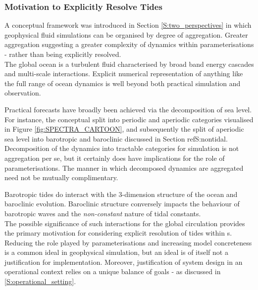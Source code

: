  
\subsubsection{Motivation to Explicitly Resolve Tides}

A conceptual framework was introduced in Section \ref{S:two_perspectives} in which geophysical fluid simulations can be organised by degree of aggregation.  Greater aggregation suggesting a greater complexity of dynamics within parameterisations - rather than being explicitly resolved.\\
The global ocean is a turbulent fluid characterised by broad band energy cascades and multi-scale interactions.  Explicit numerical representation of anything like the full range of ocean dynamics is well beyond both practical simulation and observation.  



Practical forecasts have broadly been achieved via the decomposition of sea level.   For instance, the conceptual split into periodic and aperiodic categories visualised in Figure \ref{fig:SPECTRA_CARTOON}, and subsequently the split of aperiodic sea level into barotropic and baroclinic discussed in Section ref{S:nontidal}.  Decomposition of the dynamics into tractable categories for simulation is not aggregation per se, but it certainly does have implications for the role of parameterisations.  The manner in which decomposed dynamics are aggregated need not be mutually complimentary. 



Barotropic tides do interact with the 3-dimension structure of the ocean and baroclinic evolution.   Baroclinic structure conversely impacts the behaviour of barotropic waves and the \emph{non-constant} \citep{Ray:2010jm} nature of tidal constants.\\



The possible significance of such interactions for the global circulation provides the primary motivation for considering explicit resolution of tides within \OGCM{}s.   
Reducing the role played by parameterisations and increasing model concreteness is a common ideal in geophysical simulation, but an ideal is of itself not a justification for implementation.  Moreover, justification of system design in an operational context relies on a unique balance of goals - as discussed in \ref{S:operational_setting}.\\


